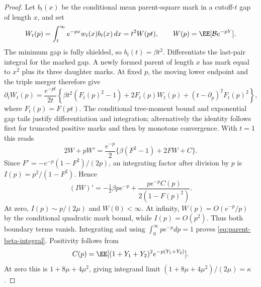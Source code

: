 \documentclass[11pt,letterpaper]{article}
\begin{document}
\begin{proof}
Let $b_t(x)$ be the conditional mean parent-square mark in a
cutoff-$t$ gap of length $x$, and set
\[
 W_t(p)=\int_t^\infty e^{-px}w_t(x)b_t(x)\,dx
             =t^2W(pt),\qquad
 W(p)=\EE[\mathcal B e^{-pY}].
\]
The minimum gap is fully shielded, so $b_t(t)=\beta t^2$.
Differentiate the last-pair integral for the marked gap.
A newly formed parent of length $x$ has mark equal to $x^2$
plus its three daughter marks. At fixed $p$, the moving lower
endpoint and the triple merger therefore give
\[
 \partial_t W_t(p)=\frac{e^{-pt}}{2t}
 \left\{\beta t^2(F_t(p)^2-1)+2F_t(p)W_t(p)
                           +(t-\partial_p)^2F_t(p)^2\right\},
\]
where $F_t(p)=F(pt)$. The conditional tree-moment bound and
exponential gap tails justify differentiation and integration;
alternatively the identity follows first for truncated positive
marks and then by monotone convergence. With $t=1$ this reads
\begin{equation}\label{eq:parent-mark-transform-ODE}
 2W+pW'=\frac{e^{-p}}2
       \{\beta(F^2-1)+2FW+C\}.
\end{equation}
Since
$F'=-e^{-p}(1-F^2)/(2p)$,
an integrating factor after division by $p$ is
$I(p)=p^2/(1-F^2)$. Hence
\[
 (IW)'=-\tfrac12\beta p e^{-p}
                  +\frac{p e^{-p}C(p)}{2(1-F(p)^2)}.
\]
At zero, $I(p)\sim p/(2\mu)$ and $W(0)<\infty$.
At infinity, $W(p)=O(e^{-p}/p)$ by the conditional quadratic
mark bound, while $I(p)=O(p^2)$. Thus both boundary terms
vanish. Integrating and using $\int_0^\infty p e^{-p}dp=1$
proves \eqref{eq:parent-beta-integral}. Positivity follows from
\[
 C(p)=\EE[(1+Y_1+Y_2)^2e^{-p(Y_1+Y_2)}].
\]
At zero this is $1+8\mu+4\mu^2$, giving integrand limit
$(1+8\mu+4\mu^2)/(2\mu)=\kappa$.


\end{proof}
\end{document}
